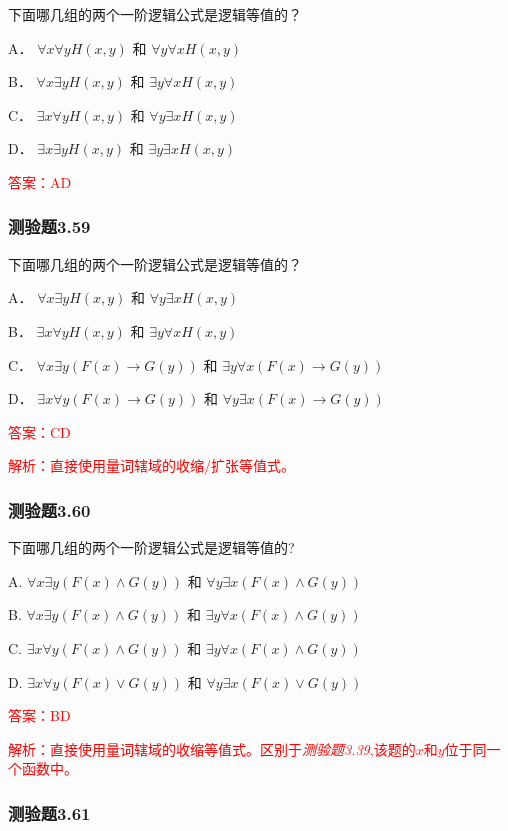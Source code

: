 \documentclass[UTF8, heading=true]{ctexart}
\begin{document}
下面哪几组的两个一阶逻辑公式是逻辑等值的？

A． $\forall x \forall y H(x, y)$ 和 $\forall y \forall x H(x, y)$

B． $\forall x \exists y H(x, y)$ 和 $\exists y \forall x H(x, y)$

C． $\exists x \forall y H(x, y)$ 和 $\forall y \exists x H(x, y)$

D． $\exists x \exists y H(x, y)$ 和 $\exists y \exists x H(x, y)$

\textcolor{red}{答案：AD}

\subsubsection{测验题3.59}

下面哪几组的两个一阶逻辑公式是逻辑等值的？

A． $\forall x \exists y H(x, y)$ 和 $\forall y \exists x H(x, y)$

B． $\exists x \forall y H(x, y)$ 和 $\exists y \forall x H(x, y)$

C． $\forall x \exists y(F(x) \rightarrow G(y))$ 和 $\exists y \forall x(F(x) \rightarrow G(y))$

D． $\exists x \forall y(F(x) \rightarrow G(y))$ 和 $\forall y \exists x(F(x) \rightarrow G(y))$

\textcolor{red}{答案：CD}

\textcolor{red}{解析：直接使用量词辖域的收缩/扩张等值式。}

\subsubsection{测验题3.60}

下面哪几组的两个一阶逻辑公式是逻辑等值的?

A. $\forall x \exists y(F(x) \wedge G(y))$ 和 $\forall y \exists x(F(x) \wedge G(y))$

B. $\forall x \exists y(F(x) \wedge G(y))$ 和 $\exists y \forall x(F(x) \wedge G(y))$

C. $\exists x \forall y(F(x) \wedge G(y))$ 和 $\exists y \forall x(F(x) \wedge G(y))$

D. $ \exists x \forall y(F(x) \vee G(y))$ 和 $\forall y \exists x(F(x) \vee G(y))$

\textcolor{red}{答案：BD}

\textcolor{red}{解析：直接使用量词辖域的收缩等值式。区别于\textit{测验题3.39},该题的$x$和$y$位于同一个函数中。}

\subsubsection{测验题3.61}
\end{document}
